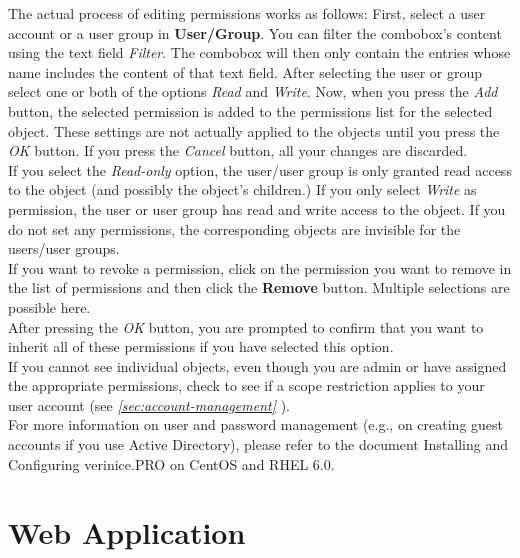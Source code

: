 \documentclass[a4paper,10pt]{book}
\begin{document}
The actual process of editing permissions works as follows: First, select a user account or a user group in \textbf{User/Group}. You can filter the combobox’s content using the text field \textit{Filter}. The combobox will then only contain the entries whose name includes the content of that text field. After selecting the user or group select one or both of the options \textit{Read} and \textit{Write}. Now, when you press the \textit{Add} button, the selected permission is added to the permissions list for the selected object. These settings are not actually applied to the objects until you press the \textit{OK} button. If you press the \textit{Cancel} button, all your changes are discarded.
\newline\\
If you select the \textit{Read-only} option, the user/user group is only granted read access to the object (and possibly the object's children.)
If you only select \textit{Write} as permission, the user or user group has read and write access to the object. If you do not set any permissions,
the corresponding objects are invisible for the users/user groups.
\newline\\
If you want to revoke a permission, click on the permission you want to remove in the list of permissions and then click the
\textbf{Remove} button. Multiple selections are possible here.
\newline\\
After pressing the \textit{OK} button, you are prompted to confirm that you want to inherit all of these permissions if you have selected this option.
\newline\\
If you cannot see individual objects, even though you are admin or have assigned the appropriate permissions, check to see if a scope restriction applies
to your user account (see {\em \ref{sec:account-management} }).
\newline\\
For more information on user and password management (e.g., on creating guest accounts if you use Active Directory), please refer to the document Installing
and Configuring verinice.\textsc{PRO} on CentOS and RHEL 6.0.

\section{Web Application}
\label{sec:web-application}
\end{document}

